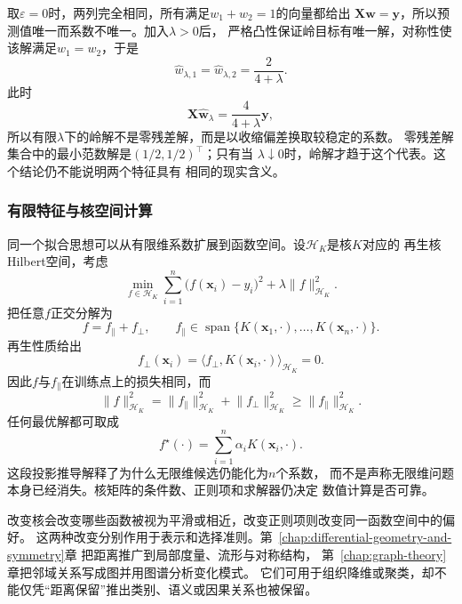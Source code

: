 \begin{example}[共线特征的可辨方向]
  \label{ex:future-collinear-ridge}
  取$\varepsilon=0$时，两列完全相同，所有满足$w_1+w_2=1$的向量都给出
  $\bm{X}\bm{w}=\bm{y}$，所以预测值唯一而系数不唯一。加入$\lambda>0$后，
  严格凸性保证岭目标有唯一解，对称性使该解满足$w_1=w_2$，于是
  \[
    \widehat w_{\lambda,1}
    =
    \widehat w_{\lambda,2}
    =
    \frac{2}{4+\lambda}.
  \]
  此时
  \[
    \bm X\widehat{\bm w}_{\lambda}
    =
    \frac{4}{4+\lambda}\bm y,
  \]
  所以有限$\lambda$下的岭解不是零残差解，而是以收缩偏差换取较稳定的系数。
  零残差解集合中的最小范数解是$(1/2,1/2)^{\top}$；只有当
  $\lambda\downarrow0$时，岭解才趋于这个代表。这个结论仍不能说明两个特征具有
  相同的现实含义。
\end{example}

\subsubsection{有限特征与核空间计算}
\label{sec:future-finite-features-kernel-space}

同一个拟合思想可以从有限维系数扩展到函数空间。设$\mathcal{H}_K$是核$K$对应的
再生核Hilbert空间，考虑
\[
  \min_{f\in\mathcal{H}_K}
  \sum_{i=1}^{n}
  \bigl(f(\bm{x}_i)-y_i\bigr)^2
  +
  \lambda\lVert f\rVert_{\mathcal{H}_K}^{2}.
\]
把任意$f$正交分解为
\[
  f=f_{\parallel}+f_{\perp},
  \qquad
  f_{\parallel}
  \in
  \operatorname{span}
  \{K(\bm{x}_1,\cdot),\ldots,K(\bm{x}_n,\cdot)\}.
\]
再生性质给出
\[
  f_{\perp}(\bm{x}_i)
  =
  \langle
    f_{\perp},K(\bm{x}_i,\cdot)
  \rangle_{\mathcal{H}_K}
  =0.
\]
因此$f$与$f_{\parallel}$在训练点上的损失相同，而
\[
  \lVert f\rVert_{\mathcal{H}_K}^{2}
  =
  \lVert f_{\parallel}\rVert_{\mathcal{H}_K}^{2}
  +
  \lVert f_{\perp}\rVert_{\mathcal{H}_K}^{2}
  \geq
  \lVert f_{\parallel}\rVert_{\mathcal{H}_K}^{2}.
\]
任何最优解都可取成
\begin{equation}
  f^\star(\cdot)
  =
  \sum_{i=1}^{n}\alpha_i K(\bm{x}_i,\cdot).
  \label{eq:future-kernel-representation}
\end{equation}
这段投影推导解释了为什么无限维候选仍能化为$n$个系数，
而不是声称无限维问题本身已经消失。核矩阵的条件数、正则项和求解器仍决定
数值计算是否可靠。

改变核会改变哪些函数被视为平滑或相近，改变正则项则改变同一函数空间中的偏好。
这两种改变分别作用于表示和选择准则。第~\ref{chap:differential-geometry-and-symmetry}章
把距离推广到局部度量、流形与对称结构，
第~\ref{chap:graph-theory}章把邻域关系写成图并用图谱分析变化模式。
它们可用于组织降维或聚类，却不能仅凭“距离保留”推出类别、语义或因果关系也被保留。

